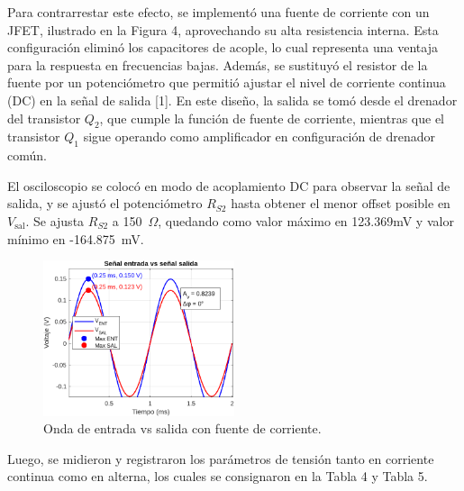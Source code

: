 \documentclass[journal]{IEEEtran}
\begin{document}
	\par Para contrarrestar este efecto, se implementó una fuente de corriente con un JFET, ilustrado en la Figura 4, aprovechando su alta resistencia interna. Esta configuración eliminó los capacitores de acople, lo cual representa una ventaja para la respuesta en frecuencias bajas. Además, se sustituyó el resistor de la fuente por un potenciómetro que permitió ajustar el nivel de corriente continua (DC) en la señal de salida [1]. En este diseño, la salida se tomó desde el drenador del transistor $Q_2$, que cumple la función de fuente de corriente, mientras que el transistor $Q_1$ sigue operando como amplificador en configuración de drenador común.
	\par El osciloscopio se colocó en modo de acoplamiento DC para observar la señal de salida, y se ajustó el potenciómetro $R_{S2}$ hasta obtener el menor offset posible en $V_{\text{sal}}$. Se ajusta $R_{S2}$ a 150~$\Omega$, quedando como valor máximo en 123.369mV y valor mínimo en -164.875~mV. 
	\begin{figure}[H]
		\centering
		\includegraphics[width=0.5\textwidth]{Media/onda_entrada_salida_corriente.png}
		\caption{Onda de entrada vs salida con fuente de corriente.}
		\label{fig:onda_entrada_salida_corriente.}
	\end{figure} 
	\par Luego, se midieron y registraron los parámetros de tensión tanto en corriente continua como en alterna, los cuales se consignaron en la Tabla 4 y Tabla 5. 
\end{document}
